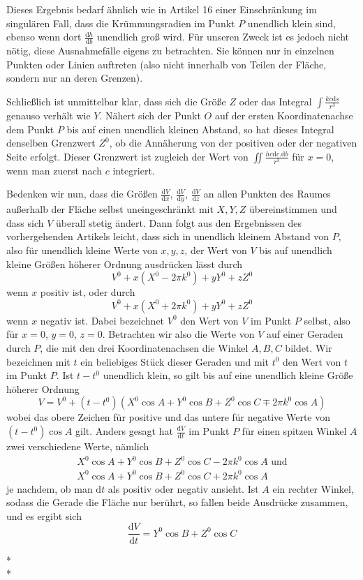 Dieses Ergebnis bedarf ähnlich wie in Artikel 16 einer Einschränkung im singulären Fall, dass die Krümmungsradien im Punkt $P$ unendlich klein sind, ebenso wenn dort $\frac{\mathrm dh}{\mathrm db}$ unendlich groß wird. Für unseren Zweck ist es jedoch nicht nötig, diese Ausnahmefälle eigens zu betrachten. Sie können nur in einzelnen Punkten oder Linien auftreten (also nicht innerhalb von Teilen der Fläche, sondern nur an deren Grenzen).

Schließlich ist unmittelbar klar, dass sich die Größe $Z$ oder das Integral $\int\frac{kc\mathrm ds}{r^3}$ genauso verhält wie $Y$. Nähert sich der Punkt $O$ auf der ersten Koordinatenachse dem Punkt $P$ bis auf einen unendlich kleinen Abstand, so hat dieses Integral denselben Grenzwert $Z^0$, ob die Annäherung von der positiven oder der negativen Seite erfolgt. Dieser Grenzwert ist zugleich der Wert von $\iint\frac{hc\mathrm dc.\mathrm db}{r^3}$ für $x=0$, wenn man zuerst nach $c$ integriert.

%


Bedenken wir nun, dass die Größen $\frac{\mathrm dV}{\mathrm dx}$, $\frac{\mathrm dV}{\mathrm dy}$, $\frac{\mathrm dV}{\mathrm dz}$ an allen Punkten des Raumes außerhalb der Fläche selbst uneingeschränkt mit $X,Y,Z$ übereinstimmen und dass sich $V$ überall stetig ändert. Dann folgt aus den Ergebnissen des vorhergehenden Artikels leicht, dass sich in unendlich kleinem Abstand von $P$, also für unendlich kleine Werte von $x,y,z$, der Wert von $V$ bis auf unendlich kleine Größen höherer Ordnung ausdrücken lässt durch
\[
V^0+x(X^0-2\pi k^0)+yY^0+zZ^0
\]
wenn $x$ positiv ist, oder durch
\[
V^0+x(X^0+2\pi k^0)+yY^0+zZ^0
\]
wenn $x$ negativ ist. Dabei bezeichnet $V^0$ den Wert von $V$ im Punkt $P$ selbst, also für $x=0$, $y=0$, $z=0$. Betrachten wir also die Werte von $V$ auf einer Geraden durch $P$, die mit den drei Koordinatenachsen die Winkel $A,B,C$ bildet. Wir bezeichnen mit $t$ ein beliebiges Stück dieser Geraden und mit $t^0$ den Wert von $t$ im Punkt $P$. Ist $t-t^0$ unendlich klein, so gilt bis auf eine unendlich kleine Größe höherer Ordnung
\[
V=V^0+(t-t^0)(X^0\cos A+Y^0\cos B+Z^0\cos C\mp2\pi k^0\cos A)
\]
wobei das obere Zeichen für positive und das untere für negative Werte von $(t-t^0)\cos A$ gilt. Anders gesagt hat $\frac{\mathrm dV}{\mathrm dt}$ im Punkt $P$ für einen spitzen Winkel $A$ zwei verschiedene Werte, nämlich
\[
\begin{gathered}
X^0\cos A+Y^0\cos B+Z^0\cos C-2\pi k^0\cos A\text{ und}\\
X^0\cos A+Y^0\cos B+Z^0\cos C+2\pi k^0\cos A
\end{gathered}
\]
je nachdem, ob man $\mathrm dt$ als positiv oder negativ ansieht. Ist $A$ ein rechter Winkel, sodass die Gerade die Fläche nur berührt, so fallen beide Ausdrücke zusammen, und es ergibt sich
\[
\frac{\mathrm dV}{\mathrm dt}=Y^0\cos B+Z^0\cos C
\]
\begin{center}*\qquad\qquad*\\{}*\end{center}


